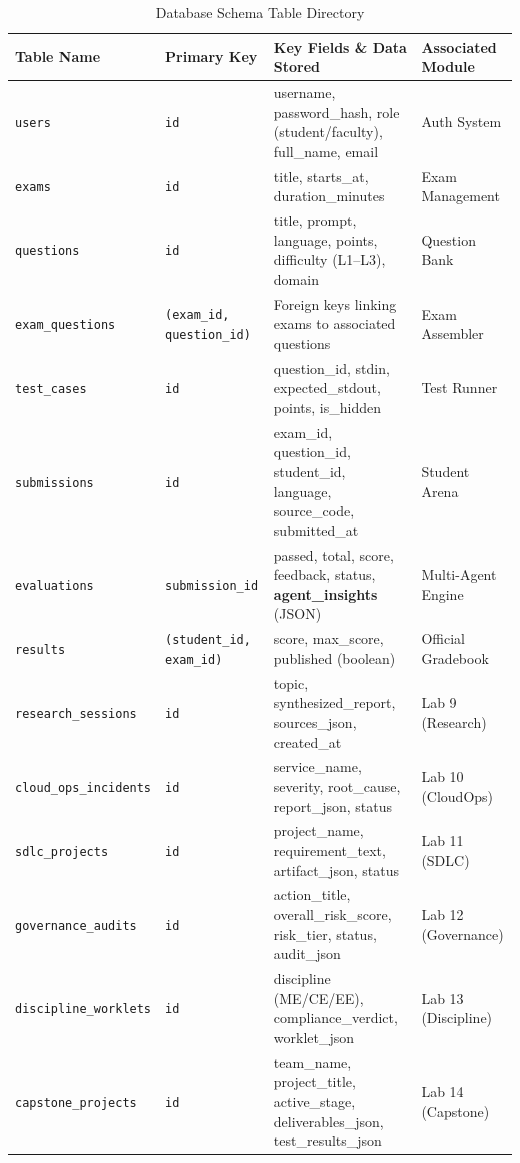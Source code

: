 \documentclass[12pt, a4paper]{report}
\begin{document}
\begin{table}[H]
\centering
\caption{Database Schema Table Directory}
\renewcommand{\arraystretch}{1.2}
\small
\begin{tabular}{|L{3.2cm}|L{2.5cm}|L{6.8cm}|L{3.2cm}|}
\hline
{}
\color{white}\textbf{Table Name} & \color{white}\textbf{Primary Key} & \color{white}\textbf{Key Fields \& Data Stored} & \color{white}\textbf{Associated Module} \\
\hline
\texttt{users} & \texttt{id} & username, password\_hash, role (student/faculty), full\_name, email & Auth System \\
\hline
{}
\texttt{exams} & \texttt{id} & title, starts\_at, duration\_minutes & Exam Management \\
\hline
\texttt{questions} & \texttt{id} & title, prompt, language, points, difficulty (L1--L3), domain & Question Bank \\
\hline
{}
\texttt{exam\_questions} & \texttt{(exam\_id, question\_id)} & Foreign keys linking exams to associated questions & Exam Assembler \\
\hline
\texttt{test\_cases} & \texttt{id} & question\_id, stdin, expected\_stdout, points, is\_hidden & Test Runner \\
\hline
{}
\texttt{submissions} & \texttt{id} & exam\_id, question\_id, student\_id, language, source\_code, submitted\_at & Student Arena \\
\hline
\texttt{evaluations} & \texttt{submission\_id} & passed, total, score, feedback, status, \textbf{agent\_insights} (JSON) & Multi-Agent Engine \\
\hline
{}
\texttt{results} & \texttt{(student\_id, exam\_id)} & score, max\_score, published (boolean) & Official Gradebook \\
\hline
\texttt{research\_sessions} & \texttt{id} & topic, synthesized\_report, sources\_json, created\_at & Lab 9 (Research) \\
\hline
{}
\texttt{cloud\_ops\_incidents} & \texttt{id} & service\_name, severity, root\_cause, report\_json, status & Lab 10 (CloudOps) \\
\hline
\texttt{sdlc\_projects} & \texttt{id} & project\_name, requirement\_text, artifact\_json, status & Lab 11 (SDLC) \\
\hline
{}
\texttt{governance\_audits} & \texttt{id} & action\_title, overall\_risk\_score, risk\_tier, status, audit\_json & Lab 12 (Governance) \\
\hline
\texttt{discipline\_worklets} & \texttt{id} & discipline (ME/CE/EE), compliance\_verdict, worklet\_json & Lab 13 (Discipline) \\
\hline
{}
\texttt{capstone\_projects} & \texttt{id} & team\_name, project\_title, active\_stage, deliverables\_json, test\_results\_json & Lab 14 (Capstone) \\
\hline
\end{tabular}
\end{table}
\end{document}
